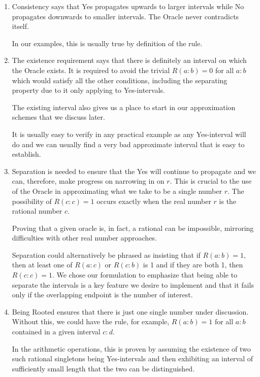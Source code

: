 \documentclass[12pt]{article}
\theoremstyle{remark}
\begin{document}
\begin{enumerate}

    \item Consistency says that Yes propagates upwards to larger intervals while No propagates downwards to smaller intervals. The Oracle never contradicts itself. 
    
    In our examples, this is usually true by definition of the rule. 

    \item The existence requirement says that there is definitely an interval on which the Oracle exists. It is required to avoid the trivial $R(a:b) = 0$ for all $a:b$ which would satisfy all the other conditions, including the separating property due to it only applying to Yes-intervals. 
    
    The existing interval also gives us a place to start in our approximation schemes that we discuss later. 
    
    It is usually easy to verify in any practical example as any Yes-interval will do and we can usually find a very bad approximate interval that is easy to establish.  

    \item Separation is needed to ensure that the Yes will continue to propagate and we can, therefore, make progress on narrowing in on $r$. This is crucial to the use of the Oracle in approximating what we take to be a single number $r$. The possibility of $R(c:c) = 1$ occurs exactly when the real number $r$ is the rational number $c$. 
    
    Proving that a given oracle is, in fact, a rational can be impossible, mirroring difficulties with other real number approaches. 

    Separation could alternatively be phrased as insisting that if $R(a:b) = 1$, then at least one of $R(a:c)$ or $R(c:b)$ is 1 and if they are both 1, then $R(c:c) = 1$. We chose our formulation to emphasize that being able to separate the intervals is a key feature we desire to implement and that it fails only if the overlapping endpoint is the number of interest. 
    
    \item Being Rooted ensures that there is just one single number under discussion. Without this, we could have the rule, for example, $R(a:b) = 1$ for all $a:b$ contained in a given interval $c:d$. 
    
    In the arithmetic operations, this is proven by assuming the existence of two such rational singletons being Yes-intervals and then exhibiting an interval of sufficiently small length that the two can be distinguished. 


\end{enumerate}
\end{document}
